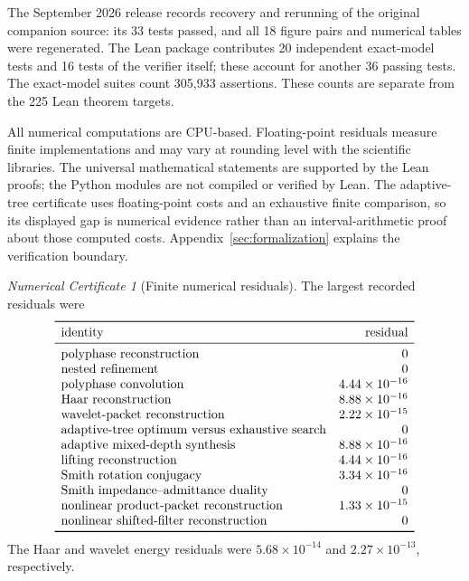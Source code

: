 \documentclass[11pt,letterpaper]{article}
\theoremstyle{plain}
\theoremstyle{plain}
\theoremstyle{plain}
\theoremstyle{definition}
\theoremstyle{definition}
\theoremstyle{definition}
\theoremstyle{definition}
\theoremstyle{remark}
\theoremstyle{remark}
\theoremstyle{remark}
\newtheorem{certificate}[certificate]{Numerical Certificate}
\theoremstyle{remark}
\begin{document}
The September 2026 release records recovery and rerunning of the original companion source: its 33 tests passed, and all 18 figure pairs and numerical tables were regenerated. The Lean package contributes 20 independent exact-model tests and 16 tests of the verifier itself; these account for another 36 passing tests. The exact-model suites count 305,933 assertions. These counts are separate from the 225 Lean theorem targets.

All numerical computations are CPU-based. Floating-point residuals measure finite implementations and may vary at rounding level with the scientific libraries. The universal mathematical statements are supported by the Lean proofs; the Python modules are not compiled or verified by Lean. The adaptive-tree certificate uses floating-point costs and an exhaustive finite comparison, so its displayed gap is numerical evidence rather than an interval-arithmetic proof about those computed costs. Appendix~\ref{sec:formalization} explains the verification boundary.

\begin{certificate}[Finite numerical residuals]\label{core:record:36}
The largest recorded residuals were
\[
\begin{array}{lr}
\toprule
\text{identity}&\text{residual}\\
\midrule
\text{polyphase reconstruction}&0\\
\text{nested refinement}&0\\
\text{polyphase convolution}&4.44\times10^{-16}\\
\text{Haar reconstruction}&8.88\times10^{-16}\\
\text{wavelet-packet reconstruction}&2.22\times10^{-15}\\
\text{adaptive-tree optimum versus exhaustive search}&0\\
\text{adaptive mixed-depth synthesis}&8.88\times10^{-16}\\
\text{lifting reconstruction}&4.44\times10^{-16}\\
\text{Smith rotation conjugacy}&3.34\times10^{-16}\\
\text{Smith impedance--admittance duality}&0\\
\text{nonlinear product-packet reconstruction}&1.33\times10^{-15}\\
\text{nonlinear shifted-filter reconstruction}&0\\
\bottomrule
\end{array}
\]
The Haar and wavelet energy residuals were $5.68\times10^{-14}$ and $2.27\times10^{-13}$, respectively.
\end{certificate}
\end{document}
